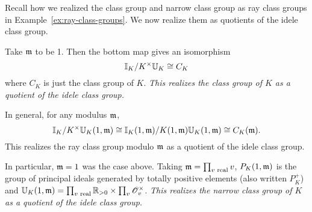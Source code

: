\begin{ex}
Recall how we realized the class group and narrow class group as ray class groups in Example~\ref{ex:ray-class-groups}. We now realize them as quotients of the idele class group.

Take $\mathfrak{m}$ to be 1. Then the bottom map gives an isomorphism
\[
\mathbb{I}_K/K^{\times}\mathbb U_K\cong C_K
\]
where $C_K$ is just the class group of $K$. %
{\it This realizes the class group of $K$ as a quotient of the idele class group.}


In general, for any modulus $\mathfrak{m}$,
\[
\mathbb{I}_K/K^{\times}\mathbb U_K(1,\mathfrak{m})\cong 
\mathbb{I}_K(1,\mathfrak{m})/K(1,\mathfrak{m})\mathbb U_K(1,\mathfrak{m})\cong 
C_K(\mathfrak{m}).
\]
This realizes the ray class group modulo $\mathfrak{m}$ as a quotient of the idele class group.

In particular, $\mathfrak{m}=1$ was the case above. Taking $\mathfrak{m}=\prod_{v\text{ real}}v$, $P_K(1,\mathfrak{m})$ is the group of principal ideals generated by totally positive elements (also written $P_K^+$)
and $\mathbb U_K(1,\mathfrak{m})=\prod_{v\text{ real}}\mathbb{R}_{>0}\times \prod_{v}\mathscr{O}_v^{\times}$. 
{\it This realizes the narrow class group of $K$ as a quotient of the idele class group.}
\end{ex}
